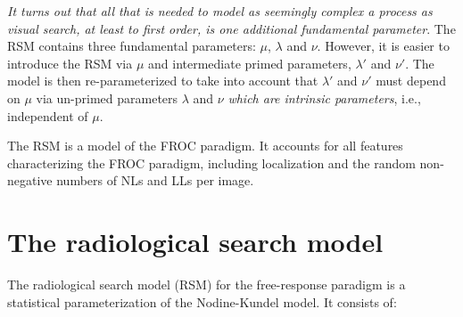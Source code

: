 \documentclass[
]{book}
\begin{document}
\emph{It turns out that all that is needed to model as seemingly complex a process as visual search, at least to first order, is one additional fundamental parameter}. The RSM contains three fundamental parameters: \(\mu\), \(\lambda\) and \(\nu\). However, it is easier to introduce the RSM via \(\mu\) and intermediate primed parameters, \(\lambda'\) and \(\nu'\). The model is then re-parameterized to take into account that \(\lambda'\) and \(\nu'\) must depend on \(\mu\) via un-primed parameters \(\lambda\) and \(\nu\) \emph{which are intrinsic parameters}, i.e., independent of \(\mu\).

The RSM is a model of the FROC paradigm. It accounts for all features characterizing the FROC paradigm, including localization and the random non-negative numbers of NLs and LLs per image.

\hypertarget{rsm-details}{%
\section{The radiological search model}\label{rsm-details}}

The radiological search model (RSM) for the free-response paradigm is a statistical parameterization of the Nodine-Kundel model. It consists of:
\end{document}
